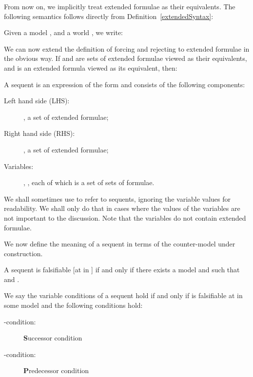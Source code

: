 \documentclass{llncs}
\numberwithin{equation}{section}
\begin{document}
From now on,  we implicitly treat extended  formulae as their  equivalents. The following semantics follows directly from Definition~\ref{extendedSyntax}:

\begin{definition}\label{extendedSemantics}
Given a  model , and a world , we write:

We can now extend the definition of forcing and rejecting to extended  formulae in the obvious way. If  and  are sets of extended  formulae viewed as their  equivalents, and  is an extended  formula viewed as its  equivalent, then:

\end{definition}

\begin{definition}[Sequent]
A  sequent is an expression of the form  and consists of the following components:
	\begin{description}
		\item[Left hand side (LHS):] , a set of extended  formulae;
		\item[Right hand side (RHS):] , a set of extended  formulae;
		\item[Variables:] , , each of which is a set of sets of formulae.
	\end{description}
\end{definition}

\noindent We shall sometimes use  to refer to sequents, ignoring the variable values for readability. We shall only do that in cases where the values of the variables are not important to the discussion. Note that the variables do not contain extended  formulae.

We now define the meaning of a sequent in terms of the counter-model under construction.

\begin{definition}[Falsifiability]\label{falsifiability}
A sequent  is falsifiable [at  in ] if and only if there exists a  model  and  such that  and .
\end{definition}

\begin{definition}
We say the variable conditions of a sequent  hold if and only if  is falsifiable at  in some model  and the following conditions hold:
		\begin{description}
			\item[-condition:] \textbf{S}uccessor condition \\
				
			\item[-condition:] \textbf{P}redecessor condition  \\
								
		\end{description}		
\end{definition}
\end{document}
